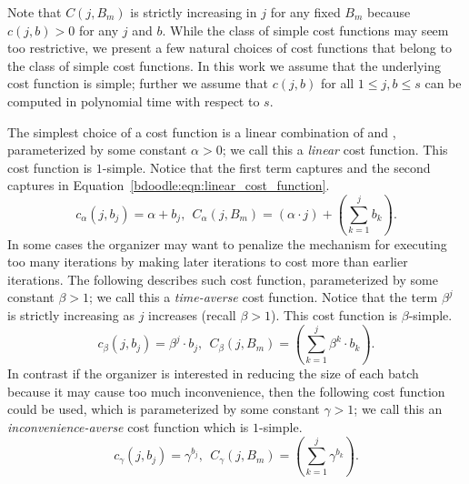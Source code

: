 Note that $C(j, B_{m})$ is strictly increasing in $j$ for any fixed $B_{m}$ because $c(j, b) > 0$ for any $j$ and $b$. While the class of simple cost functions may seem too restrictive, we present a few natural choices of cost functions that belong to the class of simple cost functions. In this work we assume that the underlying cost function is simple; further we assume that $c(j, b)$ for all $1 \leq j, b \leq s$ can be computed in polynomial time with respect to $s$.
\begin{example} \label{bdoodle:exmp:CostFunctions}
	
	The simplest choice of a cost function is a linear combination of \Times and \Inconvenience, parameterized by some constant $\alpha > 0$; we call this a \emph{linear} cost function. This cost function is $1$-simple. Notice that the first term captures \Times and the second captures \Inconveniences in Equation~\ref{bdoodle:eqn:linear_cost_function}.
	\begin{equation} \label{bdoodle:eqn:linear_cost_function}
		c_{\alpha}(j, b_j) = \alpha + b_j,
		~~	C_{\alpha}(j, {B}_m) = \left(\alpha \cdot j\right) + \left(\sum_{k=1}^{j} b_k\right).
	\end{equation}
	In some cases the organizer may want to penalize the mechanism for executing too many iterations by making later iterations to cost more than earlier iterations. The following describes such cost function, parameterized by some constant $\beta > 1$; we call this a \emph{time-averse} cost function. Notice that the term $\beta^j$ is strictly increasing as $j$ increases (recall $\beta > 1$). This cost function is $\beta$-simple.
	\begin{equation} \label{bdoodle:eqn:time_averse_cost_function}
	c_{\beta}(j, b_j) = \beta^j \cdot b_j,
	~~ C_{\beta}(j, {B}_m) = \left(\sum_{k=1}^{j} \beta^k \cdot b_k \right).
	\end{equation}
	In contrast if the organizer is interested in reducing the size of each batch because it may cause too much inconvenience, then the following cost function could be used, which is parameterized by some constant $\gamma > 1$; we call this an \emph{inconvenience-averse} cost function which is $1$-simple.
	\begin{equation} \label{bdoodle:eqn:inconvenience_averse_cost_function}
		c_{\gamma}(j, b_j) = \gamma^{b_j},
	~~ C_{\gamma}(j, {B}_m) = \left(\sum_{k=1}^{j} \gamma^{b_k} \right).
	\end{equation}
\end{example}

